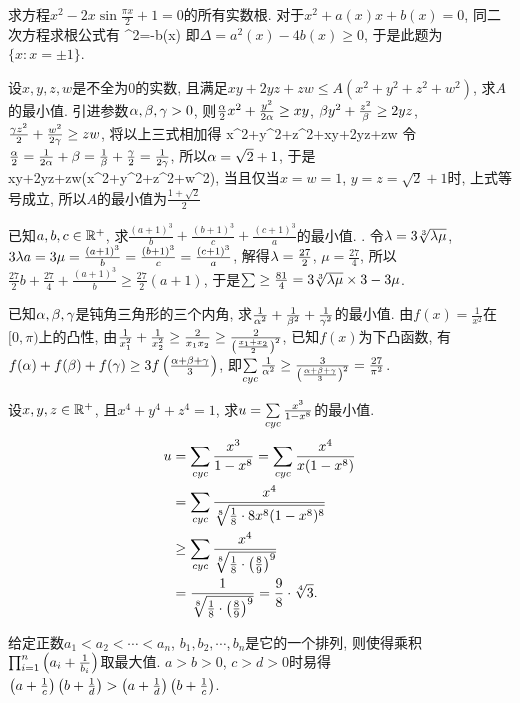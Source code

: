 \bq{}{}
求方程$x^2-2x\sin\frac{\pi x}{2}+1=0$的所有实数根.
\eq
\ba
对于$x^2+a(x)x+b(x)=0$, 同二次方程求根公式有
\bee
{}^2=-b(x)
\eee
即$\Delta=a^2(x)-4b(x)\ge0$, 于是此题为$\{x:x=\pm1\}$.
\ea

\bq{}{}
设$x,y,z,w$是不全为$0$的实数, 且满足$xy+2yz+zw\le A(x^2+y^2+z^2+w^2)$, 求$A$的最小值.
\eq
\ba
引进参数$\alpha,\beta,\gamma>0$, 则$\frac{\alpha}{2}x^2+\frac{y^2}{2\alpha}\ge xy$, $\beta y^2+\frac{z^2}{\beta}\ge2yz$, $\frac{\gamma z^2}{2}+\frac{w^2}{2\gamma}\ge zw$, 
将以上三式相加得
\bee
{}x^2+y^2+z^2+\ge xy+2yz+zw
\eee
令$\frac{\alpha}{2}=\frac1{2\alpha}+\beta=\frac1{\beta}+\frac{\gamma}{2}=\frac1{2\gamma}$, 所以$\alpha=\sqrt{2}+1$, 于是
\bee
xy+2yz+zw\le{}(x^2+y^2+z^2+w^2),
\eee
当且仅当$x=w=1$, $y=z=\sqrt{2}+1$时, 上式等号成立, 所以$A$的最小值为$\frac{1+\sqrt{2}}{2}$
\ea

\bq{}{}
已知$a,b,c\in\mathbb{R}^+$, 求$\frac{(a+1)^3}{b}+\frac{(b+1)^3}{c}+\frac{(c+1)^3}{a}$的最小值.
\eq
\ba
\bee
\sumcyc{}\ge\sumcyc{}.
\eee
令$\lambda=3\sqrt[3]{\lambda\mu}$, $3\lambda a=3\mu=\frac{(a+1)^3}{b}=\frac{(b+1)^3}{c}=\frac{(c+1)^3}{a}$, 
解得$\lambda=\frac{27}{2}$, $\mu=\frac{27}{4}$, 所以$\frac{27}{2}b+\frac{27}{4}+\frac{(a+1)^3}{b}\ge\frac{27}{2}(a+1)$,
于是$\sum\ge\frac{81}{4}=3\sqrt[3]{\lambda\mu}\times3-3\mu$.
\ea

\bq{}{}
已知$\alpha,\beta,\gamma$是钝角三角形的三个内角, 求$\frac{1}{\alpha^2}+\frac1{\beta^2}+\frac1{\gamma^2}$的最小值.
\eq
\ba
由$f(x)=\frac1{x^2}$在$[0,\pi)$上的凸性, 由$\frac1{x_1^2}+\frac1{x_2^2}\ge\frac2{x_1x_2}\ge\frac2{\left(\frac{x_1+x_2}{2}\right)^2}$,
已知$f(x)$为下凸函数, 有$f(\alpha)+f(\beta)+f(\gamma)\ge3f\left(\frac{\alpha+\beta+\gamma}{3}\right)$, 即$\sum\limits_{cyc}\frac1{\alpha^2}\ge\frac3{\left(\frac{\alpha+\beta+\gamma}{3}\right)^2}=\frac{27}{\pi^2}$.
\ea

\bq{}{}
设$x,y,z\in\mathbb{R}^+$, 且$x^4+y^4+z^4=1$, 求$u=\sum\limits_{cyc}\frac{x^3}{1-x^8}$的最小值.
\eq
\ba
\begin{align*}
u & =\sum\limits_{cyc}\frac{x^3}{1-x^8}=\sum\limits_{cyc}\frac{x^4}{x(1-x^8)}\\
  &=\sum\limits_{cyc}\frac{x^4}{\sqrt[8]{\frac18\cdot8x^8(1-x^8)^8}}\\
  &\ge\sum\limits_{cyc}\frac{x^4}{\sqrt[8]{\frac18\cdot\left(\frac89\right)^9}}\\
  &=\frac{1}{\sqrt[8]{\frac18\cdot\left(\frac89\right)^9}}=\frac98\cdot\sqrt[4]{3}.
\end{align*}
\ea

\bq{}{}
给定正数$a_1<a_2<\cdots<a_n$, $b_1,b_2,\cdots,b_n$是它的一个排列, 
则\underline{\qquad}使得乘积$\prod_{i=1}^{n}\left(a_i+\frac1{b_i}\right)$取最大值.
\eq
\ba
$a>b>0$, $c>d>0$时易得$\left(a+\frac1c\right)\left(b+\frac1d\right)>\left(a+\frac1d\right)\left(b+\frac1c\right)$.
\ea

